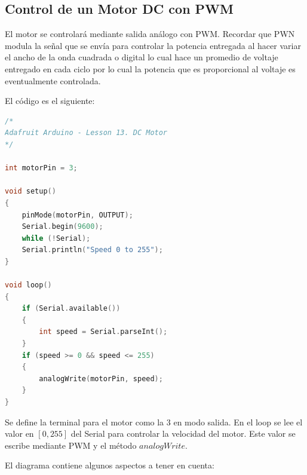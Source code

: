 \documentclass[conference]{IEEEtran}
\begin{document}
\subsection{Control de un Motor DC con PWM}

El motor se controlará mediante salida análogo con PWM. Recordar que PWN modula la señal que se envía para controlar la potencia entregada al hacer variar el ancho de la onda cuadrada o digital lo cual hace un promedio de voltaje entregado en cada ciclo por lo cual la potencia que es proporcional al voltaje es eventualmente controlada.

\bigbreak

El código es el siguiente:

\begin{lstlisting}[language=C, caption=Control de motor DC con PWM. Fuente: Adafruit Learning System $\mid$ Arduino Lesson 13. DC Motors. Under fair use. \cite{monk-dc-motors-2012}]
/*
Adafruit Arduino - Lesson 13. DC Motor
*/

int motorPin = 3;

void setup()
{
    pinMode(motorPin, OUTPUT);
    Serial.begin(9600);
    while (!Serial);
    Serial.println("Speed 0 to 255");
}

void loop()
{
    if (Serial.available())
    {
        int speed = Serial.parseInt();
    }
    if (speed >= 0 && speed <= 255)
    {
        analogWrite(motorPin, speed);
    }
}
\end{lstlisting}

Se define la terminal para el motor como la $3$ en modo salida. En el loop se lee el valor en $[0, 255]$ del Serial para controlar la velocidad del motor. Este valor se escribe mediante PWM y el método $analogWrite$.

\bigbreak

El diagrama contiene algunos aspectos a tener en cuenta:
\end{document}
